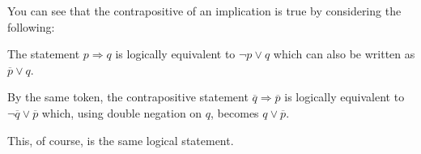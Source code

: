 \documentclass[12pt]{article}
\begin{document}
You can see that the contrapositive of an implication is true by considering
the following:

The statement $p\Rightarrow q$ is logically equivalent to $\neg p\vee q$ which can also be written as $\overline{p}\vee q$.

By the same token, the contrapositive statement $\overline{q}\Rightarrow \overline{p}$ is logically equivalent to $\neg \overline{q}\vee \overline{p}$ which, using double negation on $q$, becomes $q\vee \overline{p}$.

This, of course, is the same logical statement.
\end{document}
